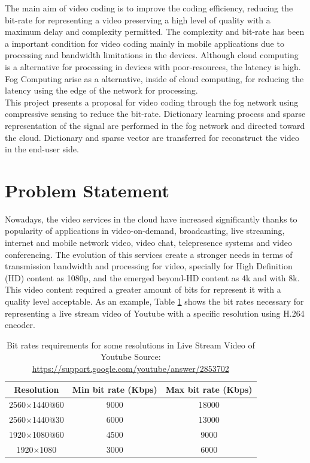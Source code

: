 The main aim of video coding is to improve the coding efficiency, reducing the bit-rate for representing a video preserving a high level of quality with a maximum delay and complexity permitted. The complexity and bit-rate has been a important condition for video coding mainly in mobile applications due to processing and bandwidth limitations in the devices. Although cloud computing is a alternative for processing in devices with poor-resources, the latency is high. Fog Computing arise as a alternative, inside of cloud computing, for reducing the latency using the edge of the network for processing. \\


This project presents a proposal for video coding through the fog network using compressive sensing to reduce the bit-rate. Dictionary learning process and sparse representation of the signal are performed in the fog network and directed toward the cloud. Dictionary and sparse vector are transferred for reconstruct the video  in the end-user side.

\section{Problem Statement}

Nowadays, the video services in the cloud have increased significantly thanks to popularity of applications in video-on-demand, broadcasting, live streaming, internet and mobile network video, video chat, telepresence systems and video conferencing. The evolution of this services create a stronger needs in terms of transmission bandwidth and processing for video, specially for High Definition (HD) content as 1080p, and the emerged beyond-HD content as 4k and with 8k. This video content required a greater amount of bits for represent it with a quality level acceptable. As an example, Table \ref{fig:youtube} shows the bit rates necessary for representing a live stream video of Youtube with a specific resolution using H.264 encoder. 

\begin{table}[!h]
\centering
\begin{tabular}{|c|c|c|}
\hline
\textbf{Resolution} & \textbf{Min bit rate (Kbps)} & \textbf{Max bit rate (Kbps)} \\
\hline
2560$\times$1440$@$60 & 9000 & 18000 \\
\hline
2560$\times$1440$@$30 &  6000 & 13000  \\
\hline
1920$\times$1080$@$60 & 4500 & 9000\\
\hline
1920$\times$1080 & 3000 & 6000 \\
\hline
\end{tabular}
\caption[Bit rates requirements for some resolutions in Live Stream Video of Youtube]{Bit rates requirements for some resolutions in Live Stream Video of Youtube \scriptsize{Source: \url{https://support.google.com/youtube/answer/2853702}}}
\label{fig:youtube}
\end{table}

